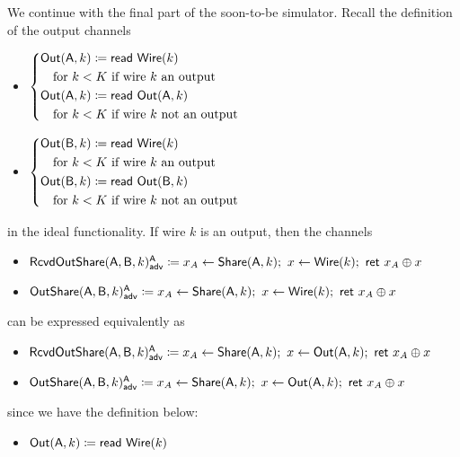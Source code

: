 \noindent We continue with the final part of the soon-to-be simulator. Recall the definition of the output channels
\begin{itemize}
\item $\begin{cases*} \Out(\A,k) \coloneqq \read{\Wire(k)} \\ \hspace{10pt} \text{for $k < K$ if wire $k$ an output} \\ \Out(\A,k) \coloneqq \read{\Out(\A,k)} \\ \hspace{10pt} \text{for $k < K$ if wire $k$ not an output} \end{cases*}$
\item $\begin{cases*} \Out(\B,k) \coloneqq \read{\Wire(k)} \\ \hspace{10pt} \text{for $k < K$ if wire $k$ an output} \\ \Out(\B,k) \coloneqq \read{\Out(\B,k)} \\ \hspace{10pt} \text{for $k < K$ if wire $k$ not an output} \end{cases*}$
\end{itemize}
in the ideal functionality. If wire $k$ is an output, then the channels
\begin{itemize}
\item {\color{blue} $\mathsf{RcvdOutShare}(\mathsf{A},\mathsf{B},k)^{\mathsf{A}}_{\mathsf{adv}} \coloneqq x_A \leftarrow \mathsf{Share}(\mathsf{A},k); \ x \leftarrow \mathsf{Wire}(k); \ \mathsf{ret} \ x_A \oplus x$}
\item {\color{blue} $\LeakOutShare(\A,\B,k)^\A_\adv \coloneqq x_A \leftarrow \Share(\A,k); \ x \leftarrow \Wire(k); \ \ret{x_A \oplus x}$}
\end{itemize}
can be expressed equivalently as
\begin{itemize}
\item {\color{blue} $\mathsf{RcvdOutShare}(\mathsf{A},\mathsf{B},k)^{\mathsf{A}}_{\mathsf{adv}} \coloneqq x_A \leftarrow \mathsf{Share}(\mathsf{A},k); \ x \leftarrow \mathsf{Out}(\mathsf{A},k); \ \mathsf{ret} \ x_A \oplus x$}
\item {\color{blue} $\LeakOutShare(\A,\B,k)^\A_\adv \coloneqq x_A \leftarrow \Share(\A,k); \ x \leftarrow \Out(\A,k); \ \ret{x_A \oplus x}$}
\end{itemize}
since we have the definition below:
\begin{itemize}
\item $\mathsf{Out}(\mathsf{A},k) \coloneqq \mathsf{read} \ \mathsf{Wire}(k)$
\end{itemize}
